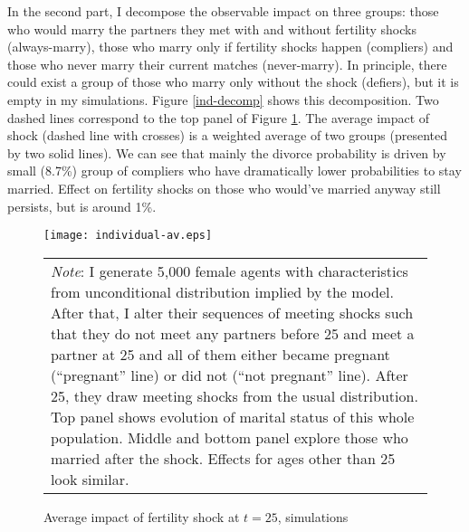 \documentclass[12pt,letter]{article}
\begin{document}
In the second part, I decompose the observable impact on three groups: those who would marry the partners they met with and without fertility shocks (always-marry), those who marry only if fertility shocks happen (compliers) and those who never marry their current matches (never-marry). In principle, there could exist a group of those who marry only without the shock (defiers), but it is empty in my simulations. Figure \ref{ind-decomp} shows this decomposition. Two dashed lines correspond to the top panel of Figure \ref{individual-av}. The average impact of shock (dashed line with crosses) is a weighted average of two groups (presented by two solid lines). We can see that mainly the divorce probability is driven by small (8.7\%) group of compliers who have dramatically lower probabilities to stay married. Effect on fertility shocks on those who would've married anyway still persists, but is around 1\%. %


\begin{figure}[h!]
\centering
\texttt{[image: individual-av.eps]}
\begin{tabular}{ p{\linewidth} }
\footnotesize \emph{Note}: I generate 5{,}000 female agents with characteristics from unconditional distribution implied by the model. After that, I alter their sequences of meeting shocks such that they do not meet any partners before 25 and meet a partner at 25 and all of them either became pregnant (``pregnant'' line) or did not (``not pregnant'' line). After 25, they draw meeting shocks from the usual distribution. Top panel shows evolution of marital status of this whole population. Middle and bottom panel explore those who married after the shock. Effects for ages other than 25 look similar. 
\end{tabular}
\caption{Average impact of fertility shock at $t=25$, simulations\label{individual-av}}
\end{figure}
\end{document}
